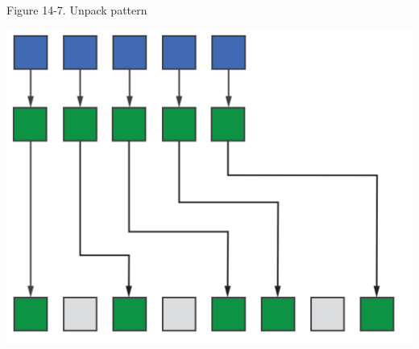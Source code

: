 \hspace*{\fill} \par %
Figure 14-7. Unpack pattern
\begin{center}
	\includegraphics[width=1.\textwidth]{content/chapter-14/images/7}
\end{center}


















